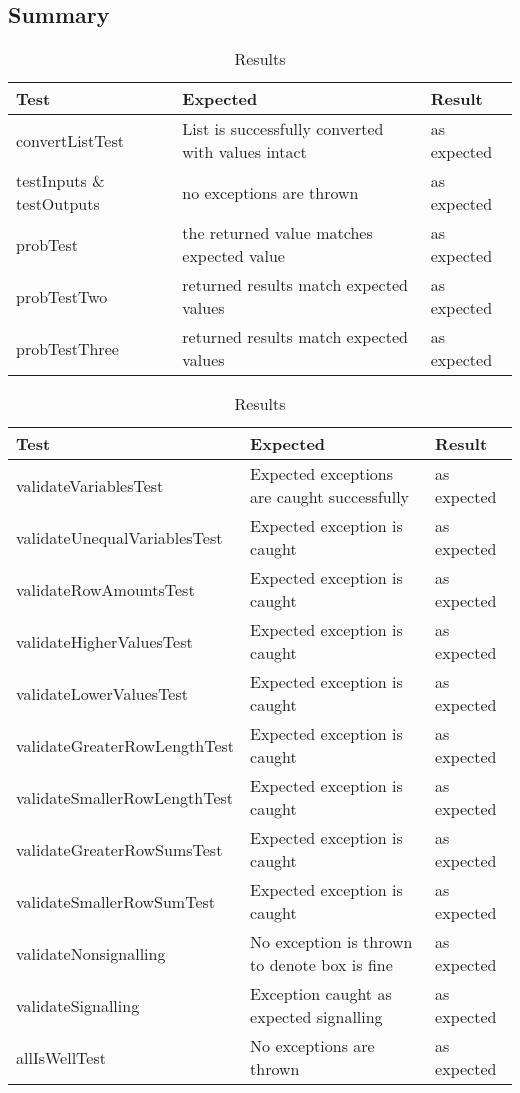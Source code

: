 \documentclass[report.tex]{subfiles}
\begin{document}
\subsection{Summary} %
\label{sub:semantics_summary}
\begin{table}[H]
    \centering
    \begin{tabular}{l | p{6cm} | l}
    Test & Expected & Result \\    
    \hline
    convertListTest & List is successfully converted with values intact
    & as expected \\
    testInputs \& testOutputs & no exceptions are thrown & as expected \\
    probTest & the returned value matches expected value & as expected \\
    probTestTwo & returned results match expected values & as expected \\
    probTestThree & returned results match expected values
    & as expected \\
    \end{tabular}
    \caption{Results}
  \label{tab:box_summary}
\end{table}
\begin{table}[H]
    \centering
    \begin{tabular}{l | p{6cm} | l}
    Test & Expected & Result \\    
    \hline
    validateVariablesTest & Expected exceptions are caught successfully 
    & as expected \\
    validateUnequalVariablesTest & Expected exception is caught 
    & as expected \\
    validateRowAmountsTest & Expected exception is caught & as expected \\
    validateHigherValuesTest & Expected exception is caught & as expected \\
    validateLowerValuesTest & Expected exception is caught & as expected \\
    validateGreaterRowLengthTest & Expected exception is caught & as expected \\
    validateSmallerRowLengthTest & Expected exception is caught & as expected \\
    validateGreaterRowSumsTest & Expected exception is caught & as expected \\
    validateSmallerRowSumTest & Expected exception is caught & as expected \\
    validateNonsignalling & No exception is thrown to denote box is fine & as expected \\
    validateSignalling & Exception caught as expected signalling & as expected \\
    allIsWellTest & No exceptions are thrown & as expected \\
    \end{tabular}
    \caption{Results}
  \label{tab:semantics_summary}
\end{table}
\end{document}
